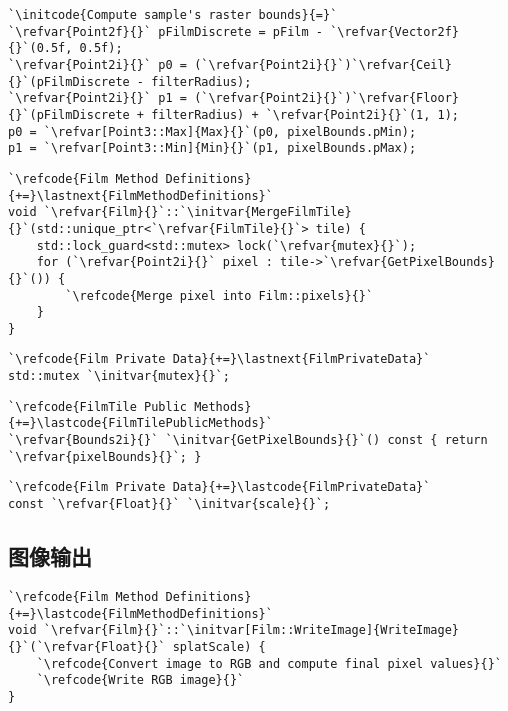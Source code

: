 \begin{lstlisting}
`\initcode{Compute sample's raster bounds}{=}`
`\refvar{Point2f}{}` pFilmDiscrete = pFilm - `\refvar{Vector2f}{}`(0.5f, 0.5f);
`\refvar{Point2i}{}` p0 = (`\refvar{Point2i}{}`)`\refvar{Ceil}{}`(pFilmDiscrete - filterRadius);
`\refvar{Point2i}{}` p1 = (`\refvar{Point2i}{}`)`\refvar{Floor}{}`(pFilmDiscrete + filterRadius) + `\refvar{Point2i}{}`(1, 1);
p0 = `\refvar[Point3::Max]{Max}{}`(p0, pixelBounds.pMin);
p1 = `\refvar[Point3::Min]{Min}{}`(p1, pixelBounds.pMax);
\end{lstlisting}

\begin{lstlisting}
`\refcode{Film Method Definitions}{+=}\lastnext{FilmMethodDefinitions}`
void `\refvar{Film}{}`::`\initvar{MergeFilmTile}{}`(std::unique_ptr<`\refvar{FilmTile}{}`> tile) {
    std::lock_guard<std::mutex> lock(`\refvar{mutex}{}`);
    for (`\refvar{Point2i}{}` pixel : tile->`\refvar{GetPixelBounds}{}`()) {
        `\refcode{Merge pixel into Film::pixels}{}`
    }
}
\end{lstlisting}
\begin{lstlisting}
`\refcode{Film Private Data}{+=}\lastnext{FilmPrivateData}`
std::mutex `\initvar{mutex}{}`;
\end{lstlisting}
\begin{lstlisting}
`\refcode{FilmTile Public Methods}{+=}\lastcode{FilmTilePublicMethods}`
`\refvar{Bounds2i}{}` `\initvar{GetPixelBounds}{}`() const { return `\refvar{pixelBounds}{}`; }
\end{lstlisting}
\begin{lstlisting}
`\refcode{Film Private Data}{+=}\lastcode{FilmPrivateData}`
const `\refvar{Float}{}` `\initvar{scale}{}`;
\end{lstlisting}

\subsection{图像输出}\label{sub:图像输出}
\begin{lstlisting}
`\refcode{Film Method Definitions}{+=}\lastcode{FilmMethodDefinitions}`
void `\refvar{Film}{}`::`\initvar[Film::WriteImage]{WriteImage}{}`(`\refvar{Float}{}` splatScale) {
    `\refcode{Convert image to RGB and compute final pixel values}{}`
    `\refcode{Write RGB image}{}`
}
\end{lstlisting}